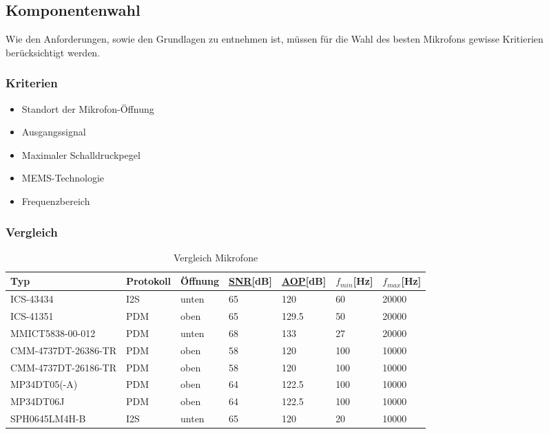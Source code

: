 \documentclass[12pt]{article}
\begin{document}
	\subsection{Komponentenwahl}
	Wie den Anforderungen, sowie den Grundlagen zu entnehmen ist, müssen für die Wahl des besten Mikrofons gewisse Kritierien berücksichtigt werden.
	\subsubsection{Kriterien}
	\begin{itemize}
		\item Standort der Mikrofon-Öffnung
		\item Ausgangssignal
		\item Maximaler Schalldruckpegel
		\item MEMS-Technologie
		\item Frequenzbereich
	\end{itemize}
	\subsubsection{Vergleich}
	\begin{table}[H]
		\centering
		\begin{tabular}{|p{}|l|l|l|l|l|l|}
			\hline
			\textbf{Typ} & \textbf{Protokoll} & \textbf{Öffnung} & \textbf{\hyperref[SNR]{SNR}[dB]} & \textbf{\hyperref[AOP]{AOP}[dB]} & \textbf{$f_{min}$[Hz]} & \textbf{$f_{max}$[Hz]} \\\hline
	ICS-43434 & I2S & unten & 65 & 120 & 60 & 20000 \\ \hline
	ICS-41351 & PDM & oben & 65 & 129.5 & 50 & 20000 \\ \hline
	MMICT5838-00-012 & PDM & unten & 68 & 133 & 27 & 20000 \\ \hline
	CMM-4737DT-26386-TR & PDM & oben & 58 & 120 & 100 & 10000 \\ \hline
	CMM-4737DT-26186-TR & PDM & oben & 58 & 120 & 100 & 10000 \\ \hline
	MP34DT05(-A) & PDM & oben & 64 & 122.5 & 100 & 10000 \\ \hline
	MP34DT06J & PDM & oben & 64 & 122.5 & 100 & 10000 \\ \hline
	SPH0645LM4H-B & I2S & unten & 65 & 120 & 20 & 10000 \\ \hline
	\end{tabular}
	\caption{Vergleich Mikrofone}
	\label{table:vergleich-mikrofone}
\end{table}
\end{document}
